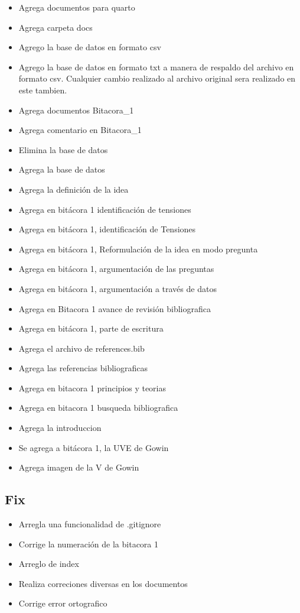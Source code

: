 \documentclass[
  letterpaper,
  DIV=11,
  numbers=noendperiod]{scrreprt}
\providecommand{\tightlist}{%
  \setlength{\itemsep}{0pt}\setlength{\parskip}{0pt}}\usepackage{longtable,booktabs,array}
\begin{document}
\begin{itemize}
\tightlist
\item
  Agrega documentos para quarto
\item
  Agrega carpeta docs
\item
  Agrego la base de datos en formato csv
\item
  Agrego la base de datos en formato txt a manera de respaldo del
  archivo en formato csv. Cualquier cambio realizado al archivo original
  sera realizado en este tambien.
\item
  Agrega documentos Bitacora\_1
\item
  Agrega comentario en Bitacora\_1
\item
  Elimina la base de datos
\item
  Agrega la base de datos
\item
  Agrega la definición de la idea
\item
  Agrega en bitácora 1 identificación de tensiones
\item
  Agrega en bitácora 1, identificación de Tensiones
\item
  Agrega en bitácora 1, Reformulación de la idea en modo pregunta
\item
  Agrega en bitácora 1, argumentación de las preguntas
\item
  Agrega en bitácora 1, argumentación a través de datos
\item
  Agrega en Bitacora 1 avance de revisión bibliografica
\item
  Agrega en bitácora 1, parte de escritura
\item
  Agrega el archivo de references.bib
\item
  Agrega las referencias bibliograficas
\item
  Agrega en bitacora 1 principios y teorias
\item
  Agrega en bitacora 1 busqueda bibliografica
\item
  Agrega la introduccion
\item
  Se agrega a bitácora 1, la UVE de Gowin
\item
  Agrega imagen de la V de Gowin
\end{itemize}

\subsection{Fix}\label{fix}

\begin{itemize}
\tightlist
\item
  Arregla una funcionalidad de .gitignore
\item
  Corrige la numeración de la bitacora 1
\item
  Arreglo de index
\item
  Realiza correciones diversas en los documentos
\item
  Corrige error ortografico
\end{itemize}
\end{document}

